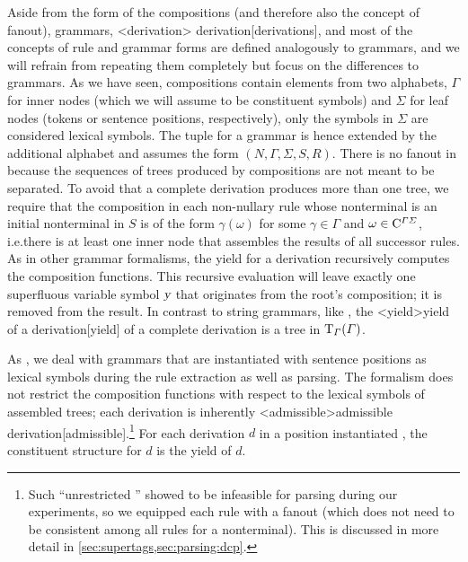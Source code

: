 \documentclass[../../document.tex]{subfiles}
\begin{document}
    Aside from the form of the compositions (and therefore also the concept of fanout),  grammars, <derivation>{ derivation}[derivations], and most of the concepts of rule and grammar forms are defined analogously to  grammars, and we will refrain from repeating them completely but focus on the differences to  grammars.
    As we have seen,  compositions contain elements from two alphabets, \(\varGamma\) for inner nodes (which we will assume to be constituent symbols) and  \(\varSigma\) for leaf nodes (tokens or sentence positions, respectively), only the symbols in \(\varSigma\) are considered lexical symbols.
    The tuple for a  grammar is hence extended by the additional alphabet and assumes the form \((N, \varGamma, \varSigma, S, R)\).
    There is no fanout in  because the sequences of trees produced by compositions are not meant to be separated.
    To avoid that a complete derivation produces more than one tree, we require that the composition in each non-nullary rule whose  nonterminal is an initial nonterminal in \(S\) is of the form \(\gamma ( \omega )\) for some \(\gamma \in \varGamma\) and \(\omega \in \mathrm{C}^{\varGamma \varSigma}\), i.e.\@ there is at least one inner node that assembles the results of all successor rules.
    As in other grammar formalisms, the yield for a derivation recursively computes the composition functions.
    This recursive evaluation will leave exactly one superfluous variable symbol \(\textsl{y}\) that originates from the root's composition; it is removed from the result.
    In contrast to string grammars, like , the <yield>{yield of a  derivation}[yield] of a complete derivation is a tree in \(\operatorname{T}_\varGamma(\varGamma)\).

    As , we deal with  grammars that are instantiated with sentence positions as lexical symbols during the rule extraction as well as parsing.
    The formalism does not restrict the composition functions with respect to the lexical symbols of assembled trees; each derivation is inherently <admissible>{admissible  derivation}[admissible].\footnote{
        Such ``unrestricted '' showed to be infeasible for parsing during our experiments, so we equipped each rule with a fanout (which does not need to be consistent among all rules for a  nonterminal).
        This is discussed in more detail in \cref{sec:supertags,sec:parsing:dcp}.
    }
    For each derivation \(d\) in a position instantiated , the constituent structure for \(d\) is the yield of \(d\).
\end{document}
